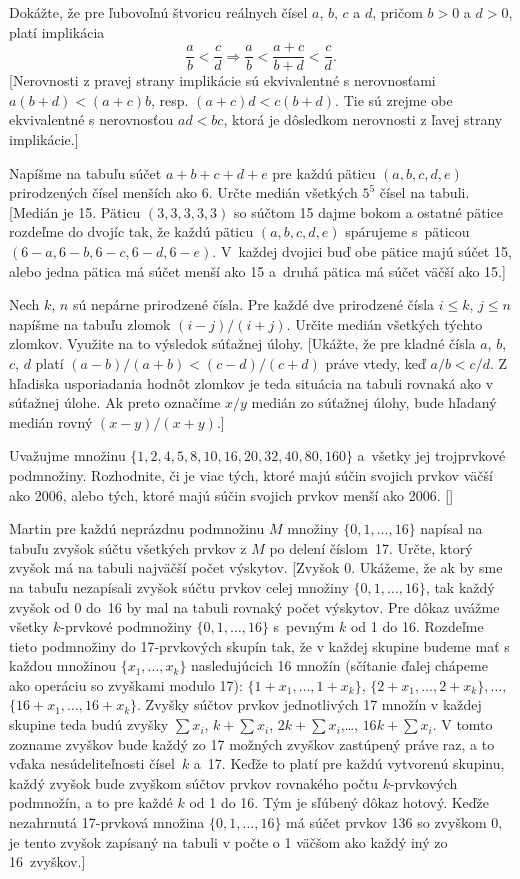 {Dokážte, že pre ľubovoľnú štvoricu reálnych čísel
$a$, $b$, $c$ a $d$, pričom $b>0$ a $d>0$, platí implikácia
$$
\frac{a}{b}<\frac{c}{d}\Rightarrow
\frac{a}{b}<\frac{a+c}{b+d}<\frac{c}{d}.
$$
[Nerovnosti z pravej strany implikácie sú
ekvivalentné s nerovnosťami $a(b+d)<(a+c)b$, resp. $(a+c)d<c(b+d)$.
Tie sú zrejme obe ekvivalentné s nerovnosťou $ad<bc$,
ktorá je dôsledkom nerovnosti z ľavej strany implikácie.]

\D
Napíšme na tabuľu súčet $a+b+c+d+e$ pre každú päticu
$(a,b,c,d,e)$ prirodzených čísel menších ako 6. Určte medián všetkých
$5^5$ čísel na tabuli.
[Medián je 15. Päticu $(3, 3, 3, 3, 3)$ so súčtom 15 dajme
bokom a ostatné pätice rozdeľme do dvojíc tak, že každú
päticu $(a, b, c, d, e)$ spárujeme s~päticou
$(6-a, 6-b, 6-c, 6-d, 6-e)$. V~každej dvojici buď
obe pätice majú súčet 15, alebo jedna pätica má súčet menší ako
15 a~druhá pätica má súčet väčší ako 15.]


Nech $k$, $n$ sú nepárne prirodzené čísla.
Pre každé dve prirodzené čísla $i\leq k$, $j\leq n$ napíšme na tabuľu
zlomok $(i-j)/(i+j)$. Určite medián všetkých týchto zlomkov.
Využite na to výsledok súťažnej úlohy.
[Ukážte, že pre kladné čísla $a$, $b$, $c$, $d$ platí
$(a-b)/(a+b)<(c-d)/(c+d)$ práve vtedy, keď $a/b<c/d$. Z hľadiska
usporiadania hodnôt zlomkov je teda situácia na tabuli rovnaká ako v
súťažnej úlohe. Ak preto označíme $x/y$ medián zo súťažnej úlohy,
bude hľadaný medián rovný $(x-y)/(x+y)$.]

Uvažujme množinu $\{1,2,4,5,8,10,16,20,32,40,80,160\}$
a~všetky jej trojprvkové podmnožiny. Rozhodnite, či je viac tých,
ktoré majú súčin svojich prvkov väčší ako 2006,
alebo tých, ktoré majú súčin svojich prvkov menší ako 2006.
[]

Martin pre každú neprázdnu podmnožinu $M$ množiny
$\{0, 1, \dots, 16\}$ napísal
na tabuľu zvyšok súčtu všetkých prvkov z $M$ po delení
číslom~17. Určte, ktorý zvyšok má na tabuli
najväčší počet výskytov.
[Zvyšok 0. Ukážeme, že
ak by sme na tabuľu nezapísali zvyšok súčtu prvkov
celej množiny $\{0,1,\dots,16\}$,
tak každý zvyšok od 0 do~16 by mal na tabuli rovnaký počet výskytov.
Pre dôkaz uvážme všetky
$k$-prvkové podmnožiny $\{0,1,\dots,16\}$ s~pevným $k$ od 1 do 16.
Rozdeľme tieto podmnožiny do 17-prvkových skupín tak, že v každej
skupine budeme mať s každou množinou $\{x_1, \dots, x_k\}$
nasledujúcich 16 množín (sčítanie ďalej chápeme ako operáciu so
zvyškami modulo 17):
$\{1+x_1, \dots,1+x_k\}$,
$\{2+x_1, \dots,2+x_k\},\dots,$
$\{16+x_1, \dots,16+x_k\}$.
Zvyšky súčtov prvkov jednotlivých 17 množín
v každej skupine teda budú zvyšky
$\sum x_i$, $k+\sum x_i$, $2k+\sum x_i$,\dots, $16k+\sum x_i$.
V tomto zozname zvyškov bude každý zo 17 možných zvyškov
zastúpený práve raz, a to vďaka nesúdeliteľnosti čísel~$k$ a~17.
Keďže to platí pre každú vytvorenú skupinu,
každý zvyšok bude zvyškom súčtov prvkov rovnakého počtu
$k$-prvkových podmnožín, a to pre každé $k$ od 1 do 16. Tým je
sľúbený dôkaz hotový. Keďže nezahrnutá 17-prvková množina
$\{0,1,\dots,16\}$ má súčet prvkov 136 so zvyškom 0,
je tento zvyšok zapísaný na tabuli v počte o 1 väčšom
ako každý iný zo 16~zvyškov.]


}
